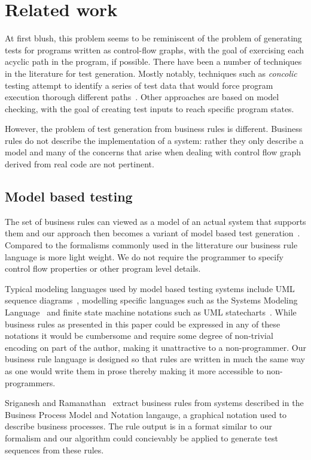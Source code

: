 \section{Related work}

At first blush, this problem seems to be reminiscent of the problem of
generating tests for programs written as control-flow graphs, with the
goal of exercising each acyclic path in the program, if possible.
There have been a number of techniques in the literature for test
generation. Mostly notably, techniques such as \textit{concolic}
testing attempt to identify a series of test data that would force
program execution thorough different paths~\cite{dart, concolic}.  Other
approaches are based on model checking, with the goal of creating test
inputs to reach specific program states.

However, the problem of test generation from business rules is
different. Business rules do not describe the implementation of a
system: rather they only describe a model and many of the concerns
that arise when dealing with control flow graph derived from real code
are not pertinent.

\subsection{Model based testing}

The set of business rules can viewed as a model of an actual system
that supports them and our approach then becomes a variant of model
based test generation~\cite{utting2012}. Compared to the formalisms commonly used in the
litterature our business rule language is more light weight. We do not
require the programmer to specify control flow properties or other
program level details.

Typical modeling languages used by model based testing systems include
UML sequence diagrams~\cite{nayak2009}, modelling specific languages
such as the Systems Modeling Language~\cite{friedenthal2011} and
finite state machine notations such as UML
statecharts~\cite{offhut99}. While business rules as presented in this
paper could be expressed in any of these notations it would be
cumbersome and require some degree of non-trivial encoding on part of
the author, making it unattractive to a non-programmer. Our business
rule language is designed so that rules are written in much the same
way as one would write them in prose thereby making it more accessible
to non-programmers.

Sriganesh and Ramanathan~\cite{sriganesh2012} extract business rules
from systems described in the Business Process Model and Notation
langauge, a graphical notation used to describe business
processes. The rule output is in a format similar to our formalism and
our algorithm could concievably be applied to generate test sequences
from these rules.

